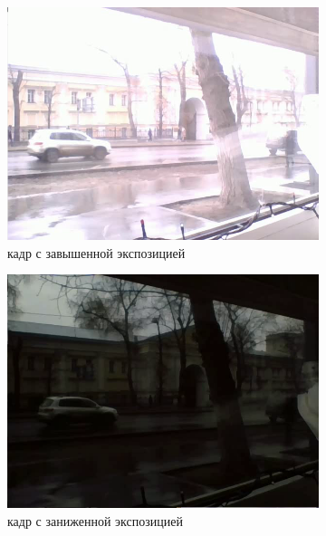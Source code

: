 \begin{figure}[!tbp]
  \centering
  \begin{subfigure}{.5\textwidth}
    \includegraphics[width=\textwidth]{img/exposure1_car.png}
    \caption{ кадр с завышенной экспозицией}
    \label{fig:exposure1_car}
  \end{subfigure}\hfill
  \begin{subfigure}{.5\textwidth}
    \includegraphics[width=\textwidth]{img/exposure2_car.png}
    \caption{ кадр с заниженной экспозицией}
    \label{fig:exposure2_car}
  \end{subfigure}\hfill
  \begin{subfigure}{1\textwidth}

\end{subfigure}
\end{figure}
